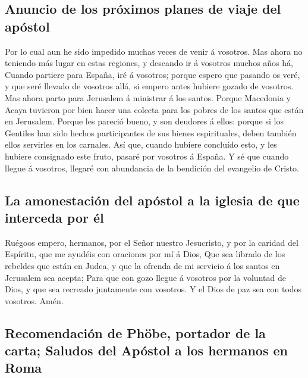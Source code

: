 \hypertarget{anuncio-de-los-pruxf3ximos-planes-de-viaje-del-apuxf3stol}{%
\subsection{Anuncio de los próximos planes de viaje del
apóstol}\label{anuncio-de-los-pruxf3ximos-planes-de-viaje-del-apuxf3stol}}

 Por lo cual aun he sido impedido muchas veces de venir á
vosotros.  Mas ahora no teniendo más lugar en estas
regiones, y deseando ir á vosotros muchos años há,  Cuando
partiere para España, iré á vosotros; porque espero que pasando os veré,
y que seré llevado de vosotros allá, si empero antes hubiere gozado de
vosotros.  Mas ahora parto para Jerusalem á ministrar á los
santos.  Porque Macedonia y Acaya tuvieron por bien hacer
una colecta para los pobres de los santos que están en Jerusalem.
 Porque les pareció bueno, y son deudores á ellos: porque
si los Gentiles han sido hechos participantes de sus bienes
espirituales, deben también ellos servirles en los carnales.
 Así que, cuando hubiere concluído esto, y les hubiere
consignado este fruto, pasaré por vosotros á España.  Y sé
que cuando llegue á vosotros, llegaré con abundancia de la bendición del
evangelio de Cristo.

\hypertarget{la-amonestaciuxf3n-del-apuxf3stol-a-la-iglesia-de-que-interceda-por-uxe9l}{%
\subsection{La amonestación del apóstol a la iglesia de que interceda
por
él}\label{la-amonestaciuxf3n-del-apuxf3stol-a-la-iglesia-de-que-interceda-por-uxe9l}}

 Ruégoos empero, hermanos, por el Señor nuestro Jesucristo,
y por la caridad del Espíritu, que me ayudéis con oraciones por mí á
Dios,  Que sea librado de los rebeldes que están en Judea,
y que la ofrenda de mi servicio á los santos en Jerusalem sea acepta;
 Para que con gozo llegue á vosotros por la voluntad de
Dios, y que sea recreado juntamente con vosotros.  Y el
Dios de paz sea con todos vosotros. Amén.

\hypertarget{recomendaciuxf3n-de-phuxf6be-portador-de-la-carta-saludos-del-apuxf3stol-a-los-hermanos-en-roma}{%
\subsection{Recomendación de Phöbe, portador de la carta; Saludos del
Apóstol a los hermanos en
Roma}\label{recomendaciuxf3n-de-phuxf6be-portador-de-la-carta-saludos-del-apuxf3stol-a-los-hermanos-en-roma}}

